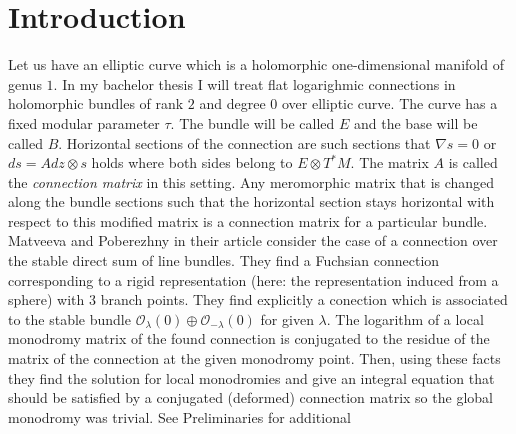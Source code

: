 \documentclass[../main.tex]{subfiles}
\begin{document}
    \section*{Introduction}\label{sec:introduction}




    Let us have an elliptic curve which is a holomorphic one-dimensional
    manifold of genus $1$.
    In my bachelor thesis I will treat flat logarighmic connections
    in holomorphic bundles of rank $2$ and degree $0$ over elliptic curve.
    The curve has a fixed modular parameter $\tau$.
    The bundle will be called $E$ and the base will be called $B$.
%
    Horizontal sections of the connection are such sections that
    $\nabla s = 0$ or $d s = A dz \otimes s $ holds where both sides belong to
    $E \otimes T^*M$. The matrix $A$ is called the \textit{connection matrix} in this setting. 
    Any  meromorphic matrix that is changed along the bundle sections
    such that the horizontal section stays horizontal with
    respect to this modified matrix is a
    connection matrix for a particular bundle.
    Matveeva and Poberezhny in their article \cite{matveeva2017two} consider the case of a connection over the stable direct sum of line bundles.
    They find a Fuchsian connection corresponding to a rigid representation
    (here: the representation induced from a sphere) with $3$ branch points.
    They find explicitly a conection which is associated to the stable bundle
    $\mathcal{O}_{\lambda} (0) \oplus \mathcal{O}_{-\lambda} (0)$ for
    given $\lambda$.
    The logarithm of a local monodromy matrix of the found connection is conjugated to
    the residue of the matrix of the connection at the given monodromy point.
    Then, using these facts they find the solution for local monodromies and
    give an integral equation that should be
    satisfied by a conjugated (deformed) connection matrix so the global
    monodromy was trivial. See Preliminaries for additional
\end{document}
